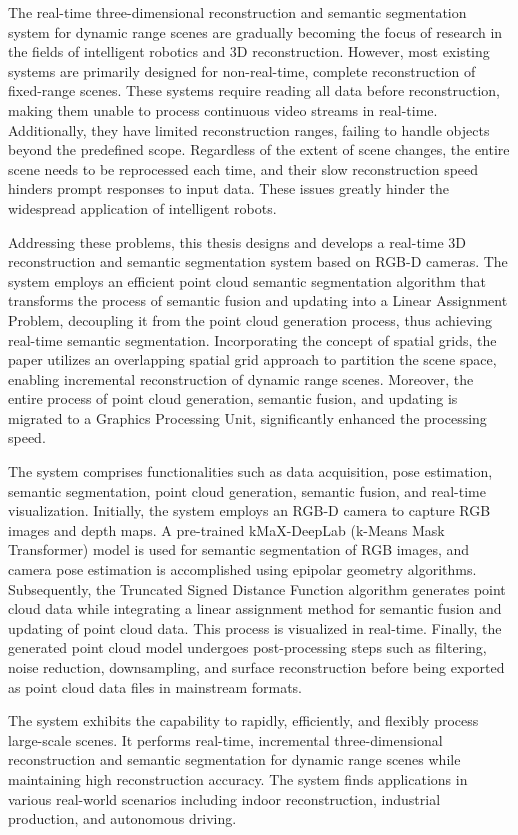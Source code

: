 \begin{abstract*}
	\par The real-time three-dimensional reconstruction and semantic segmentation system for dynamic range scenes are gradually becoming the focus of research in the fields of intelligent robotics and 3D reconstruction. However, most existing systems are primarily designed for non-real-time, complete reconstruction of fixed-range scenes. These systems require reading all data before reconstruction, making them unable to process continuous video streams in real-time. Additionally, they have limited reconstruction ranges, failing to handle objects beyond the predefined scope. Regardless of the extent of scene changes, the entire scene needs to be reprocessed each time, and their slow reconstruction speed hinders prompt responses to input data. These issues greatly hinder the widespread application of intelligent robots.

	\par Addressing these problems, this thesis designs and develops a real-time 3D reconstruction and semantic segmentation system based on RGB-D cameras. The system employs an efficient point cloud semantic segmentation algorithm that transforms the process of semantic fusion and updating into a Linear Assignment Problem, decoupling it from the point cloud generation process, thus achieving real-time semantic segmentation. Incorporating the concept of spatial grids, the paper utilizes an overlapping spatial grid approach to partition the scene space, enabling incremental reconstruction of dynamic range scenes. Moreover, the entire process of point cloud generation, semantic fusion, and updating is migrated to a Graphics Processing Unit, significantly enhanced the processing speed.
	
	\par The system comprises functionalities such as data acquisition, pose estimation, semantic segmentation, point cloud generation, semantic fusion, and real-time visualization. Initially, the system employs an RGB-D camera to capture RGB images and depth maps. A pre-trained kMaX-DeepLab (k-Means Mask Transformer) model is used for semantic segmentation of RGB images, and camera pose estimation is accomplished using epipolar geometry algorithms. Subsequently, the Truncated Signed Distance Function algorithm generates point cloud data while integrating a linear assignment method for semantic fusion and updating of point cloud data. This process is visualized in real-time. Finally, the generated point cloud model undergoes post-processing steps such as filtering, noise reduction, downsampling, and surface reconstruction before being exported as point cloud data files in mainstream formats.
	
	\par The system exhibits the capability to rapidly, efficiently, and flexibly process large-scale scenes. It performs real-time, incremental three-dimensional reconstruction and semantic segmentation for dynamic range scenes while maintaining high reconstruction accuracy. The system finds applications in various real-world scenarios including indoor reconstruction, industrial production, and autonomous driving.
\end{abstract*}
